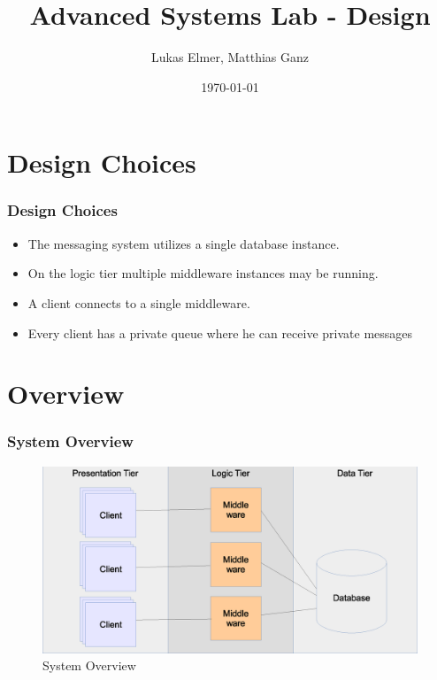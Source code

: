 \documentclass{beamer}
\title{Advanced Systems Lab - Design}
\author{Lukas Elmer, Matthias Ganz}
\date{\today}
\begin{document}

\begin{frame}
\titlepage
\end{frame} 




\section{Design Choices}
\begin{frame}
\frametitle{Design Choices}

\begin{itemize}
\item The messaging system utilizes a single database instance. 
\item On the logic tier multiple middleware instances may be running. 
\item A client connects to a single middleware.
\item{Every client has a private queue where he can receive private messages}

\end{itemize}

\end{frame}



\section{Overview}
\begin{frame}
\frametitle{System Overview}

\begin{figure}
  \begin{center}
  
    \includegraphics[scale=0.4]{../../drawings/system-overview.eps}
    
  \end{center}
  \caption{System Overview}
  \label{fig:system-overview}
\end{figure}


\end{frame}
\end{document}
